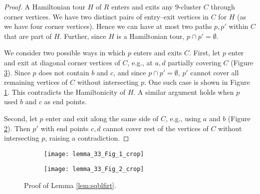 \begin{proof}
  A Hamiltonian tour $H$ of $R$ enters and exits any $9$-cluster $C$ through corner vertices.
  We have two distinct pairs of entry--exit vertices in $C$ for $H$ (as we have four corner vertices).
  Hence we can have at most two paths $p, p'$ within $C$ that are part of $H$.
  Further, since $H$ is a Hamiltonian tour, $p \cap p' = \emptyset$. 

  We consider two possible ways in which $p$ enters and exits $C$.
  First, let $p$ enter and exit at diagonal corner vertices of $C$, e.g., at $a, d$ partially covering $C$ (Figure \ref{fig:lemma33}).
  Since $p$ does not contain $b$ and $c$, and since $p \cap p' = \emptyset$, $p'$ cannot cover all remaining vertices of $C$ without intersecting $p$.
  One such case is shown in Figure \ref{fig:lemma33a}.
  This contradicts the Hamiltonicity of $H$.
  A similar argument holds when $p$ used $b$ and $c$ as end points. 

  Second, let $p$ enter and exit along the same side of $C$, e.g., using $a$ and $b$ (Figure \ref{fig:lemma33b}).
  Then $p'$ with end points $c, d$ cannot cover rest of the vertices of $C$ without intersecting $p$, raising a contradiction.
\end{proof}

\begin{figure}[htp!] 
  \centering
  \begin{subfigure}[t]{2.5in}
    \centering
    \texttt{[image: lemma\_33\_Fig\_1\_crop]}
    \caption{\label{fig:lemma33a}}
  \end{subfigure}
  \begin{subfigure}[t]{2.5in}
    \centering
    \texttt{[image: lemma\_33\_Fig\_2\_crop]}
    \caption{\label{fig:lemma33b}}
  \end{subfigure}	
  \caption{\label{fig:lemma33}
    Proof of Lemma \ref{lem:sqblfirt}.
  }
\end{figure}


